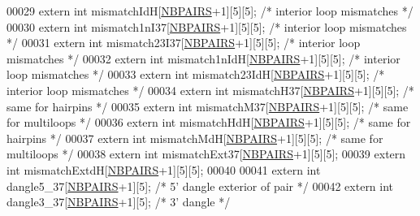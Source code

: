 \begin{DoxyCode}
00029 \textcolor{keyword}{extern} \textcolor{keywordtype}{int} mismatchIdH[\hyperlink{energy__const_8h_a5e75221c779d618eab81e096f37e32ce}{NBPAIRS}+1][5][5];  \textcolor{comment}{/* interior loop mismatches */}
00030 \textcolor{keyword}{extern} \textcolor{keywordtype}{int} mismatch1nI37[\hyperlink{energy__const_8h_a5e75221c779d618eab81e096f37e32ce}{NBPAIRS}+1][5][5];  \textcolor{comment}{/* interior loop mismatches */}
00031 \textcolor{keyword}{extern} \textcolor{keywordtype}{int} mismatch23I37[\hyperlink{energy__const_8h_a5e75221c779d618eab81e096f37e32ce}{NBPAIRS}+1][5][5];  \textcolor{comment}{/* interior loop mismatches */}
00032 \textcolor{keyword}{extern} \textcolor{keywordtype}{int} mismatch1nIdH[\hyperlink{energy__const_8h_a5e75221c779d618eab81e096f37e32ce}{NBPAIRS}+1][5][5];  \textcolor{comment}{/* interior loop mismatches */}
00033 \textcolor{keyword}{extern} \textcolor{keywordtype}{int} mismatch23IdH[\hyperlink{energy__const_8h_a5e75221c779d618eab81e096f37e32ce}{NBPAIRS}+1][5][5];  \textcolor{comment}{/* interior loop mismatches */}
00034 \textcolor{keyword}{extern} \textcolor{keywordtype}{int} mismatchH37[\hyperlink{energy__const_8h_a5e75221c779d618eab81e096f37e32ce}{NBPAIRS}+1][5][5];  \textcolor{comment}{/* same for hairpins */}
00035 \textcolor{keyword}{extern} \textcolor{keywordtype}{int} mismatchM37[\hyperlink{energy__const_8h_a5e75221c779d618eab81e096f37e32ce}{NBPAIRS}+1][5][5];  \textcolor{comment}{/* same for multiloops */}
00036 \textcolor{keyword}{extern} \textcolor{keywordtype}{int} mismatchHdH[\hyperlink{energy__const_8h_a5e75221c779d618eab81e096f37e32ce}{NBPAIRS}+1][5][5];  \textcolor{comment}{/* same for hairpins */}
00037 \textcolor{keyword}{extern} \textcolor{keywordtype}{int} mismatchMdH[\hyperlink{energy__const_8h_a5e75221c779d618eab81e096f37e32ce}{NBPAIRS}+1][5][5];  \textcolor{comment}{/* same for multiloops */}
00038 \textcolor{keyword}{extern} \textcolor{keywordtype}{int} mismatchExt37[\hyperlink{energy__const_8h_a5e75221c779d618eab81e096f37e32ce}{NBPAIRS}+1][5][5];
00039 \textcolor{keyword}{extern} \textcolor{keywordtype}{int} mismatchExtdH[\hyperlink{energy__const_8h_a5e75221c779d618eab81e096f37e32ce}{NBPAIRS}+1][5][5];
00040 
00041 \textcolor{keyword}{extern} \textcolor{keywordtype}{int} dangle5\_37[\hyperlink{energy__const_8h_a5e75221c779d618eab81e096f37e32ce}{NBPAIRS}+1][5];      \textcolor{comment}{/* 5' dangle exterior of pair */}
00042 \textcolor{keyword}{extern} \textcolor{keywordtype}{int} dangle3\_37[\hyperlink{energy__const_8h_a5e75221c779d618eab81e096f37e32ce}{NBPAIRS}+1][5];      \textcolor{comment}{/* 3' dangle */}

\end{DoxyCode}
